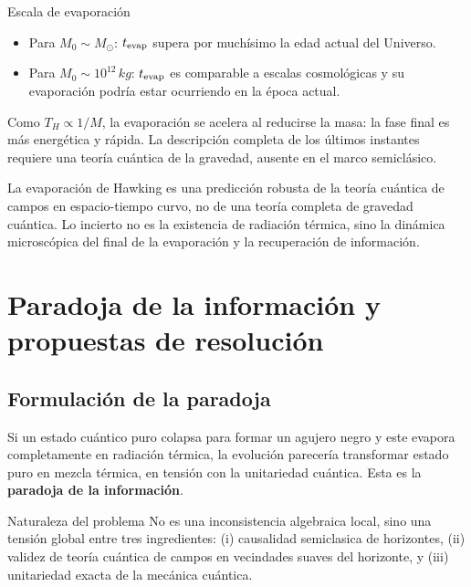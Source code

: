 \begin{ejemplo}{Escala de evaporación}{}
\begin{itemize}[leftmargin=2em]
  \item Para $M_0\sim M_\odot$: $t_{\rm evap}$ supera por muchísimo la edad actual del Universo.
  \item Para $M_0\sim10^{12}\,\si{kg}$: $t_{\rm evap}$ es comparable a escalas cosmológicas y su evaporación podría estar ocurriendo en la época actual.
\end{itemize}
\end{ejemplo}

Como $T_H\propto1/M$, la evaporación se acelera al reducirse la masa: la fase final es más energética y rápida. La descripción completa de los últimos instantes requiere una teoría cuántica de la gravedad, ausente en el marco semiclásico.

\begin{importante}
La evaporación de Hawking es una predicción robusta de la teoría cuántica de campos en espacio-tiempo curvo, no de una teoría completa de gravedad cuántica. Lo incierto no es la existencia de radiación térmica, sino la dinámica microscópica del final de la evaporación y la recuperación de información.
\end{importante}

\section{Paradoja de la información y propuestas de resolución}
\label{sec:paradoja_info}

\subsection{Formulación de la paradoja}

Si un estado cuántico puro colapsa para formar un agujero negro y este evapora completamente en radiación térmica, la evolución parecería transformar estado puro en mezcla térmica, en tensión con la unitariedad cuántica. Esta es la \textbf{paradoja de la información}.

\begin{observacion}{Naturaleza del problema}{}
No es una inconsistencia algebraica local, sino una tensión global entre tres ingredientes: (i) causalidad semiclasica de horizontes, (ii) validez de teoría cuántica de campos en vecindades suaves del horizonte, y (iii) unitariedad exacta de la mecánica cuántica.
\end{observacion}


